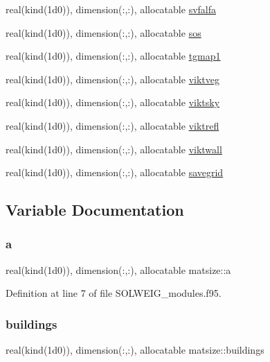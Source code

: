 \begin{DoxyCompactItemize}
\item 
real(kind(1d0)), dimension(\+:,\+:), allocatable \hyperlink{namespacematsize_a8fd9348664bd661da87ca40af12bed50}{svfalfa}
\item 
real(kind(1d0)), dimension(\+:,\+:), allocatable \hyperlink{namespacematsize_a1449eeb1e7360b8c66d2b3d039acf99b}{sos}
\item 
real(kind(1d0)), dimension(\+:,\+:), allocatable \hyperlink{namespacematsize_a86f180bc19d9a733d20cd41559fc9c15}{tgmap1}
\item 
real(kind(1d0)), dimension(\+:,\+:), allocatable \hyperlink{namespacematsize_ad54fb3efcdbb5a40c1d00fb2795c4482}{viktveg}
\item 
real(kind(1d0)), dimension(\+:,\+:), allocatable \hyperlink{namespacematsize_a0e44ed5f655a5ed08b631369eee6d6e6}{viktsky}
\item 
real(kind(1d0)), dimension(\+:,\+:), allocatable \hyperlink{namespacematsize_ab651f44e70ead8097cd71733bf545246}{viktrefl}
\item 
real(kind(1d0)), dimension(\+:,\+:), allocatable \hyperlink{namespacematsize_a2268200b373b89fec089619c8f9d777e}{viktwall}
\item 
real(kind(1d0)), dimension(\+:,\+:), allocatable \hyperlink{namespacematsize_a955b428c1737be712b663eeca12e7446}{savegrid}
\end{DoxyCompactItemize}


\subsection{Variable Documentation}
\mbox{\label{namespacematsize_ac6b0576a44123086ec1fcb4fd07ae0cf}} 
\subsubsection{\texorpdfstring{a}{a}}
{\footnotesize\ttfamily real(kind(1d0)), dimension(\+:,\+:), allocatable matsize\+::a}



Definition at line 7 of file S\+O\+L\+W\+E\+I\+G\+\_\+modules.\+f95.

\mbox{\label{namespacematsize_a2787e88d9e90f148065c39be4439c550}} 
\subsubsection{\texorpdfstring{buildings}{buildings}}
{\footnotesize\ttfamily real(kind(1d0)), dimension(\+:,\+:), allocatable matsize\+::buildings}



